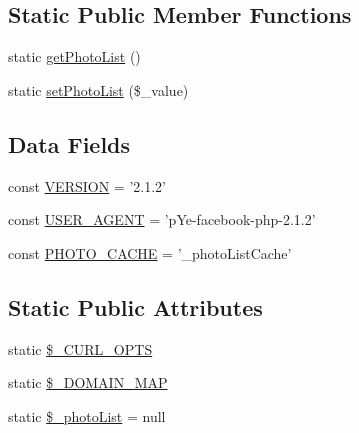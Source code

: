 \subsection*{Static Public Member Functions}
\begin{DoxyCompactItemize}
\item 
static \hyperlink{classCPSFacebook_ab3989d2377763fb40cb29086ef272f6e}{getPhotoList} ()
\item 
static \hyperlink{classCPSFacebook_ad35e44440b0eff84cccdfd1db697c639}{setPhotoList} (\$\_\-value)
\end{DoxyCompactItemize}
\subsection*{Data Fields}
\begin{DoxyCompactItemize}
\item 
const \hyperlink{classCPSFacebook_af71005841ce53adac00581ab0ba24c1f}{VERSION} = '2.1.2'
\item 
const \hyperlink{classCPSFacebook_aad50057168703fbd6bcab2c2c6e4d628}{USER\_\-AGENT} = 'pYe-\/facebook-\/php-\/2.1.2'
\item 
const \hyperlink{classCPSFacebook_afba99abd768bc1f4376bbd82d153d50b}{PHOTO\_\-CACHE} = '\_\-photoListCache'
\end{DoxyCompactItemize}
\subsection*{Static Public Attributes}
\begin{DoxyCompactItemize}
\item 
static \hyperlink{classCPSFacebook_a386bcc77c2c57c89359cc7632ac521ad}{\$\_\-CURL\_\-OPTS}
\item 
static \hyperlink{classCPSFacebook_af39417a7550a728b1f3486fd0a9d3f55}{\$\_\-DOMAIN\_\-MAP}
\item 
static \hyperlink{classCPSFacebook_a7e2b66c375158928ec4cfa9de801ac0b}{\$\_\-photoList} = null
\end{DoxyCompactItemize}
